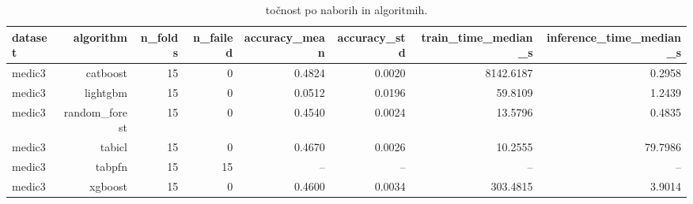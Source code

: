 \begin{table}[htbp]
\centering
\caption{točnost po naborih in algoritmih.}
\label{tab:per-dataset}
\begin{tabular}{lrrrrrrr}
\hline
dataset & algorithm & n\_folds & n\_failed & accuracy\_mean & accuracy\_std & train\_time\_median\_s & inference\_time\_median\_s \\
\hline
medic3 & catboost & 15 & 0 & 0.4824 & 0.0020 & 8142.6187 & 0.2958 \\
medic3 & lightgbm & 15 & 0 & 0.0512 & 0.0196 & 59.8109 & 1.2439 \\
medic3 & random\_forest & 15 & 0 & 0.4540 & 0.0024 & 13.5796 & 0.4835 \\
medic3 & tabicl & 15 & 0 & 0.4670 & 0.0026 & 10.2555 & 79.7986 \\
medic3 & tabpfn & 15 & 15 & -- & -- & -- & -- \\
medic3 & xgboost & 15 & 0 & 0.4600 & 0.0034 & 303.4815 & 3.9014 \\
\hline
\end{tabular}
\end{table}
